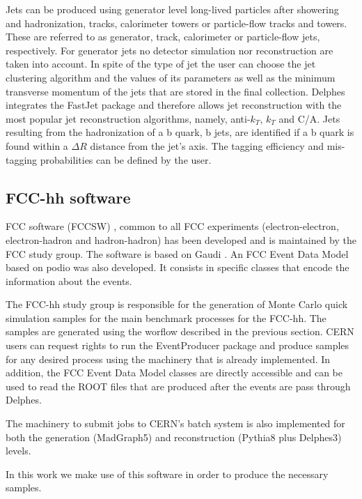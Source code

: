 Jets can be produced using generator level long-lived particles after showering and hadronization, tracks, calorimeter towers or particle-flow tracks and towers. These are referred to as generator, track, calorimeter or particle-flow jets, respectively. For generator jets no detector simulation nor reconstruction are taken into account. In spite of the type of jet the user can choose the jet clustering algorithm and the values of its parameters as well as the minimum transverse momentum of the jets that are stored in the final collection. Delphes integrates the FastJet package \cite{fastjet} and therefore allows jet reconstruction with the most popular jet reconstruction algorithms, namely, anti-$k_T$, $k_T$ and C/A. 
Jets resulting from the hadronization of a b quark, b jets, are identified if a b quark is found within a $\Delta R$ distance from the jet's axis. The tagging efficiency and mis-tagging probabilities can be defined by the user. 

\subsection{FCC-hh software}
\label{subsec:FCC_software}

FCC software (FCCSW) \cite{FCCSW}, common to all FCC experiments (electron-electron, electron-hadron and hadron-hadron) has been developed and is maintained by the FCC study group. The software is based on Gaudi \cite{gaudi}. An FCC Event Data Model based on podio \cite{Podio} was also developed. It consists in specific classes that encode the information about the events.

The FCC-hh study group is responsible for the generation of Monte Carlo quick simulation samples for the main benchmark processes for the FCC-hh. The samples are generated using the worflow described in the previous section. CERN users can request rights to run the EventProducer package \cite{FCCEventProducer} and produce samples for any desired process using the machinery that is already implemented. In addition, the FCC Event Data Model classes are directly accessible and can be used to read the ROOT files that are produced after the events are pass through Delphes.

The machinery to submit jobs to CERN's batch system is also implemented for both the generation (MadGraph5) and reconstruction (Pythia8 plus Delphes3) levels.

In this work we make use of this software in order to produce the necessary samples.

